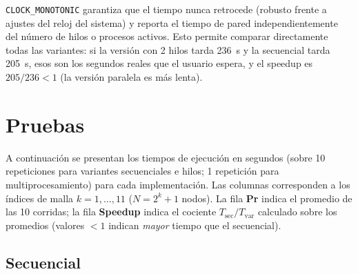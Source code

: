 \documentclass{article}
\begin{document}
\texttt{CLOCK\_MONOTONIC} garantiza que el tiempo nunca retrocede (robusto frente
a ajustes del reloj del sistema) y reporta el tiempo de pared independientemente
del número de hilos o procesos activos.  Esto permite comparar directamente
todas las variantes: si la versión con 2 hilos tarda 236~s y la secuencial
tarda 205~s, esos son los segundos reales que el usuario espera, y el speedup
es $205/236 < 1$ (la versión paralela es más lenta).

\section{Pruebas}

A continuación se presentan los tiempos de ejecución en segundos (sobre 10
repeticiones para variantes secuenciales e hilos; 1 repetición para
multiprocesamiento) para cada implementación.  Las columnas corresponden a los
índices de malla $k=1,\ldots,11$ ($N = 2^k+1$ nodos).  La fila
\textbf{Pr} indica el promedio de las 10 corridas; la fila
\textbf{Speedup} indica el cociente $T_{\text{sec}} / T_{\text{var}}$ calculado
sobre los promedios (valores $<1$ indican \emph{mayor} tiempo que el secuencial).

\subsection{Secuencial}
\end{document}
